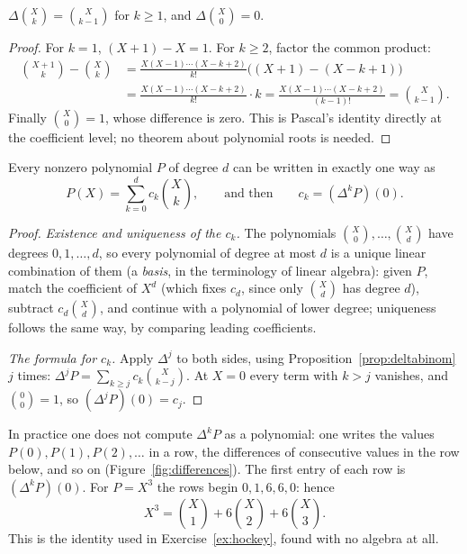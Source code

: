 \begin{proposition}\label{prop:deltabinom}
$\Delta\binom Xk=\binom X{k-1}$ for $k\ge1$, and $\Delta\binom X0=0$.
\end{proposition}
\begin{proof}
For $k=1$, $(X+1)-X=1$. For $k\ge2$, factor the common product:
\[
\begin{aligned}
\binom{X+1}k-\binom Xk
&=\frac{X(X-1)\cdots(X-k+2)}{k!}\bigl((X+1)-(X-k+1)\bigr)\\
&=\frac{X(X-1)\cdots(X-k+2)}{k!}\cdot k
=\frac{X(X-1)\cdots(X-k+2)}{(k-1)!}=\binom X{k-1}.
\end{aligned}
\]
Finally $\binom X0=1$, whose difference is zero. This is Pascal's identity directly at the coefficient level; no theorem about polynomial roots is needed.
\end{proof}

\begin{theorem}\label{thm:newton}
Every nonzero polynomial $P$ of degree $d$ can be written in exactly one way as
\[
P(X)=\sum_{k=0}^dc_k\binom Xk,\qquad\text{and then}\qquad c_k=(\Delta^kP)(0).
\]
\end{theorem}
\begin{proof}
\emph{Existence and uniqueness of the $c_k$.} The polynomials $\binom X0,\dots,\binom Xd$ have degrees $0,1,\dots,d$, so every polynomial of degree at most $d$ is a unique linear combination of them (a \emph{basis}, in the terminology of linear algebra): given $P$, match the coefficient of $X^d$ (which fixes $c_d$, since only $\binom Xd$ has degree $d$), subtract
$c_d\binom Xd$, and continue with a polynomial of lower degree; uniqueness follows the same way, by comparing leading coefficients.

\emph{The formula for $c_k$.} Apply $\Delta^j$ to both sides, using Proposition~\ref{prop:deltabinom} $j$ times: $\Delta^jP=\sum_{k\ge j}c_k\binom X{k-j}$.
At $X=0$ every term with $k>j$ vanishes, and $\binom00=1$, so $(\Delta^jP)(0)=c_j$.
\end{proof}

In practice one does not compute $\Delta^kP$ as a polynomial: one writes the values $P(0),P(1),P(2),\dots$ in a row, the differences of consecutive
values in the row below, and so on (Figure~\ref{fig:differences}). The first entry of each row is $(\Delta^kP)(0)$. For $P=X^3$ the rows begin
$0,1,6,6,0$: hence
\[
X^3=\binom X1+6\binom X2+6\binom X3.
\]
This is the identity used in Exercise~\ref{ex:hockey}, found with no algebra at all.

